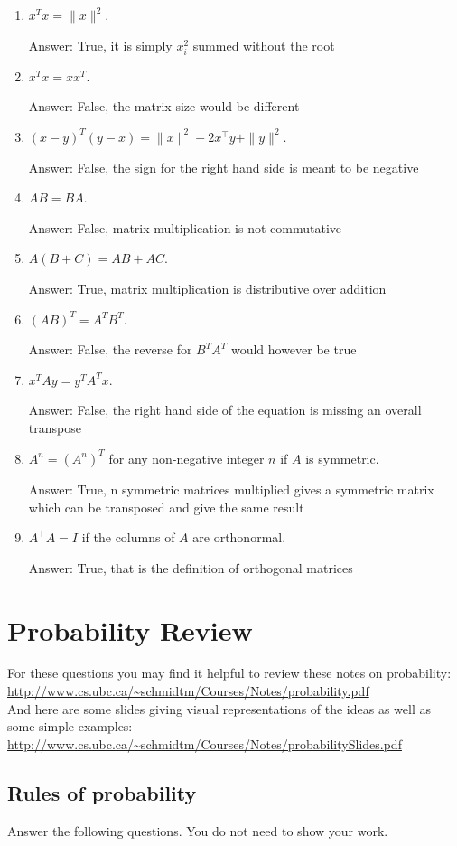 \documentclass{article}
\def\ans#1{\par\gre{Answer: #1}}
\def\blu#1{{\color{blu}#1}}
\def\gre#1{{\color{gre}#1}}
\def\norm#1{\|#1\|}
\begin{document}
\begin{enumerate}
\item $x^Tx = \norm{x}^2$.
\ans{True, it is simply $x_i^2$ summed without the root}
\item $x^Tx = xx^T$.
\ans{False, the matrix size would be different}
\item $(x-y)^T(y-x) = \norm{x}^2 - 2x^\top y + \norm{y}^2$.
\ans{False, the sign for the right hand side is meant to be negative}
\item $AB=BA$.
\ans{False, matrix multiplication is not commutative}
\item $A(B + C) = AB + AC$.
\ans{True, matrix multiplication is distributive over addition}
\item $(AB)^T = A^TB^T$.
\ans{False, the reverse for $B^TA^T$ would however be true}
\item $x^TAy = y^TA^Tx$.
\ans{False, the right hand side of the equation is missing an overall transpose}
\item $A^n = (A^n)^T$ for any non-negative integer $n$ if $A$ is symmetric.
\ans{True, n symmetric matrices multiplied gives a symmetric matrix which can be transposed and give the same result}
\item $A^\top A = I$ if the columns of $A$ are orthonormal.
\ans{True, that is the definition of orthogonal matrices}
\end{enumerate}

\pagebreak
\section{Probability Review}


For these questions you may find it helpful to review these notes on probability:\\
\url{http://www.cs.ubc.ca/~schmidtm/Courses/Notes/probability.pdf}\\
And here are some slides giving visual representations of the ideas as well as some simple examples:\\
\url{http://www.cs.ubc.ca/~schmidtm/Courses/Notes/probabilitySlides.pdf}

\subsection{Rules of probability}

\blu{Answer the following questions.} You do not need to show your work.
\end{document}
